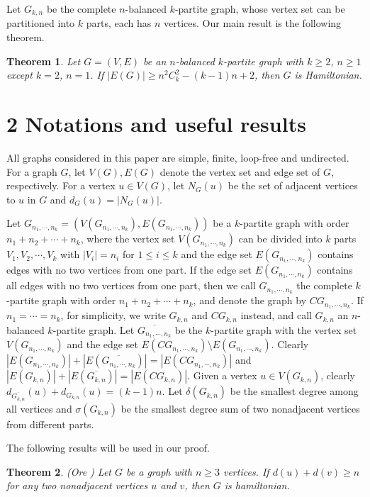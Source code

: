 \documentclass[reqno]{amsart}
\newtheorem{theorem}{Theorem}
\begin{document}
 Let $G_{k,n}$ be the complete $n$-balanced $k$-partite graph, whose vertex set can be partitioned into $k$ parts, each has $n$ vertices. Our main result is the following theorem.\\
\begin{theorem}\label{theorem1} Let \normalsize $G=(V,E)$ be an $n$-balanced $k$-partite graph with $k \geq 2$,  $n \geq 1$ except $k=2$, $n=1$.  If $|E(G)| \geq n^{2} C_{k}^{2}-(k-1) n+2 $, then $G$ is Hamiltonian.
\end{theorem}
\section{2  \quad Notations and useful results}


\quad All graphs considered in this paper are simple, finite, loop-free and undirected. For a graph $G$, let $V(G),E(G)$ denote the vertex set and edge set of $G$, respectively. For a vertex $u \in V(G)$, let $N_G(u)$ be the set of adjacent vertices to $u$ in $G$ and $d_G(u) =|N_G(u)|$.

Let $G_{n_1,\cdots,n_k}=(V(G_{n_1,\cdots,n_k}),E(G_{n_1,\cdots,n_k}))$ be a $k$-partite graph with order $n_1+n_2+\cdots+n_k$, where the vertex set $V(G_{n_1,\cdots,n_k})$ can be divided into $k$ parts $V_1,V_2,\cdots,V_k$ with $|V_i|=n_i$ for $1 \leq i \leq k$ and the edge set $E(G_{n_1,\cdots,n_k})$ contains edges with no two vertices from one part.   If the edge set $E(G_{n_1,\cdots,n_k})$ contains all edges with no two vertices from one part, then we call $G_{n_1,\cdots,n_k}$ the complete $k$-partite graph with order $n_1+n_2+\cdots+n_k$, and denote the graph by $CG_{n_1,\cdots,n_k}$.  If $n_1=\cdots=n_k$, for simplicity, we write $G_{k,n}$ and $CG_{k,n}$ instead, and call $G_{k,n}$ an $n$-balanced $k$-partite graph. Let $\overline{G_{n_1,\cdots,n_k}}$ be the $k$-partite graph with the vertex set $V(G_{n_1,\cdots,n_k})$ and the edge set
$E(CG_{n_1,\cdots,n_k})\setminus E(G_{n_1,\cdots,n_k})$.  Clearly $|E(G_{n_1,\cdots,n_k})|+|E(\overline{G_{n_1,\cdots,n_k}})| = |E(CG_{n_1,\cdots,n_k})|$ and $|E(G_{k,n})|+|E(\overline{G_{k,n}})| = |E(CG_{k,n})|$.
Given a vertex $u\in V(G_{k,n})$,  clearly $d_{\overline{G_{k,n}}}(u)+d_{G_{k,n}}(u) =(k-1)n$. Let $ \delta(G_{k,n})$ be the smallest degree among all vertices and $ \sigma(G_{k,n})$ be the smallest degree sum of two nonadjacent vertices from different parts.

The following results will be used in our proof.
\begin{theorem}(Ore \cite{1960Note}) Let $G$ be a graph with  $n \geq 3$ vertices. If $d(u)+d(v) \geq n$ for any two nonadjacent vertices $u$ and $v$, then $G$ is hamiltonian.
\end{theorem}
\end{document}
